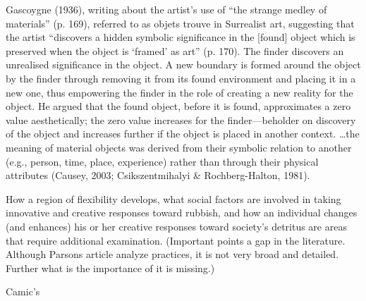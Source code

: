 Gascoygne (1936), writing about the artist’s use of “the strange medley of materials” (p. 169), referred to as objets trouve in Surrealist art, suggesting that the artist “discovers a hidden symbolic significance in the [found] object which is preserved when the object is ‘framed’ as art” (p. 170). The finder discovers an unrealised significance in the object. A new boundary is formed around the object by the finder through removing it from its found environment and placing it in a new one, thus empowering the finder in the role of creating a new reality for the object. He argued that the found object, before it is found, approximates a zero value aesthetically; the zero value increases for the finder---beholder on discovery of the object and increases further if the object is placed in another context. \ldots the meaning of material objects was derived from their symbolic relation to another (e.g., person, time, place, experience) rather than through their physical attributes (Causey, 2003; Csikszentmihalyi \& Rochberg-Halton, 1981). 

How a region of flexibility develops, what social factors are involved in taking innovative and creative responses toward rubbish, and how an individual changes (and enhances) his or her creative responses toward society’s detritus are areas that require additional examination. (Important points a gap in the literature. Although Parsons article analyze practices, it is not very broad and detailed. Further what is the importance of it is missing.)

Camic's  

